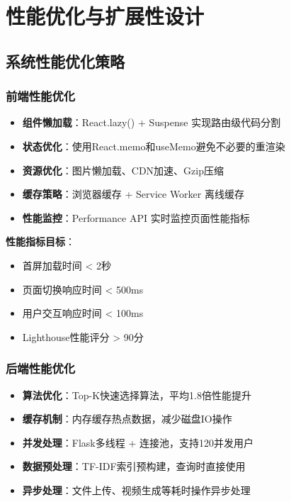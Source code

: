 \documentclass[12pt,a4paper]{article}
\begin{document}
\section{性能优化与扩展性设计}

\subsection{系统性能优化策略}

\subsubsection{前端性能优化}

\begin{successbox}[title={前端性能优化方案}]
\begin{itemize}[nosep]
    \item \textbf{组件懒加载}：React.lazy() + Suspense 实现路由级代码分割
    \item \textbf{状态优化}：使用React.memo和useMemo避免不必要的重渲染
    \item \textbf{资源优化}：图片懒加载、CDN加速、Gzip压缩
    \item \textbf{缓存策略}：浏览器缓存 + Service Worker 离线缓存
    \item \textbf{性能监控}：Performance API 实时监控页面性能指标
\end{itemize}
\end{successbox}

\textbf{性能指标目标}：
\begin{itemize}
    \item 首屏加载时间 < 2秒
    \item 页面切换响应时间 < 500ms
    \item 用户交互响应时间 < 100ms
    \item Lighthouse性能评分 > 90分
\end{itemize}

\subsubsection{后端性能优化}

\begin{successbox}[title={后端性能优化方案}]
\begin{itemize}[nosep]
    \item \textbf{算法优化}：Top-K快速选择算法，平均1.8倍性能提升
    \item \textbf{缓存机制}：内存缓存热点数据，减少磁盘IO操作
    \item \textbf{并发处理}：Flask多线程 + 连接池，支持120并发用户
    \item \textbf{数据预处理}：TF-IDF索引预构建，查询时直接使用
    \item \textbf{异步处理}：文件上传、视频生成等耗时操作异步处理
\end{itemize}
\end{successbox}
\end{document}
